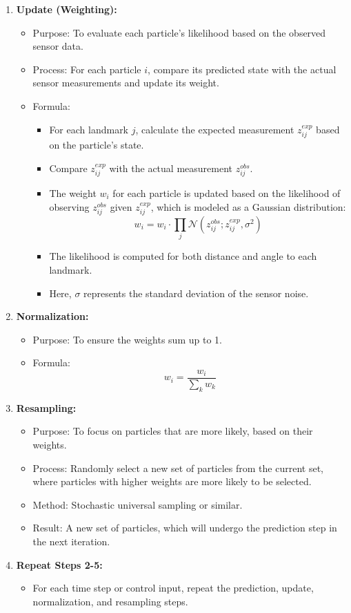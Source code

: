 \documentclass{article}
\begin{document}
\begin{enumerate}
    \item \textbf{Update (Weighting):}
    \begin{itemize}
        \item Purpose: To evaluate each particle's likelihood based on the observed sensor data.
        \item Process: For each particle $i$, compare its predicted state with the actual sensor measurements and update its weight.
        \item Formula:
        \begin{itemize}
            \item For each landmark $j$, calculate the expected measurement $z_{ij}^{exp}$ based on the particle's state.
            \item Compare $z_{ij}^{exp}$ with the actual measurement $z_{ij}^{obs}$.
            \item The weight $w_i$ for each particle is updated based on the likelihood of observing $z_{ij}^{obs}$ given $z_{ij}^{exp}$, which is modeled as a Gaussian distribution:
            \[ w_i = w_i \cdot \prod_j \mathcal{N}(z_{ij}^{obs}; z_{ij}^{exp}, \sigma^2) \]
            \item The likelihood is computed for both distance and angle to each landmark.
            \item Here, $\sigma$ represents the standard deviation of the sensor noise.
        \end{itemize}
    \end{itemize}
    
    \item \textbf{Normalization:}
    \begin{itemize}
        \item Purpose: To ensure the weights sum up to 1.
        \item Formula:
        \[ w_i = \frac{w_i}{\sum_k w_k} \]
    \end{itemize}
    
    \item \textbf{Resampling:}
    \begin{itemize}
        \item Purpose: To focus on particles that are more likely, based on their weights.
        \item Process: Randomly select a new set of particles from the current set, where particles with higher weights are more likely to be selected.
        \item Method: Stochastic universal sampling or similar.
        \item Result: A new set of particles, which will undergo the prediction step in the next iteration.
    \end{itemize}
    
    \item \textbf{Repeat Steps 2-5:}
    \begin{itemize}
        \item For each time step or control input, repeat the prediction, update, normalization, and resampling steps.
    \end{itemize}
\end{enumerate}
\end{document}
